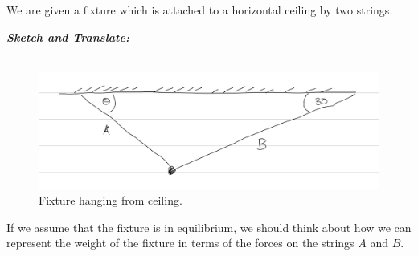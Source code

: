 %
%
%


\begin{subquestions}

\subquestion
We are given a fixture which is attached to a horizontal ceiling by two strings.
\begin{subsubquestions}

\subsubquestion

\textbf{\textit{Sketch and Translate:}} \\ \\
\begin{figure}[H]
	\begin{center}
		\includegraphics[scale=0.25]{../2016/figures/2016q5-1}
		\caption{\label{2016:q5:Sketch1} Fixture hanging from ceiling.}
	\end{center}
\end{figure}
If we assume that the fixture is in equilibrium, we should think about how we can represent the weight of the fixture in terms of the forces on the strings $A$ and $B$.





\end{subsubquestions}
\end{subquestions}

